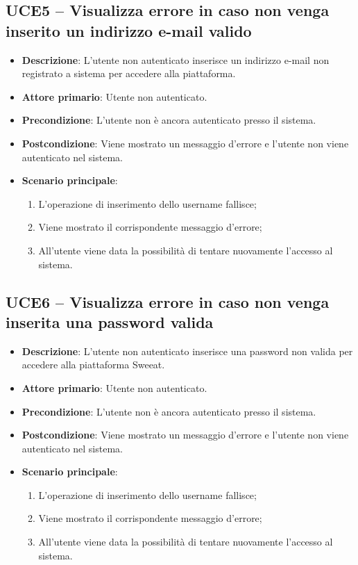\subsection{UCE5 – Visualizza errore in caso non venga inserito un indirizzo e-mail valido}
\begin{itemize}
\item \textbf{Descrizione}: L'utente non autenticato inserisce un indirizzo e-mail non registrato a sistema per accedere alla piattaforma.
\item \textbf{Attore primario}: Utente non autenticato.
\item \textbf{Precondizione}: L'utente non è ancora autenticato presso il sistema.
\item \textbf{Postcondizione}: Viene mostrato un messaggio d'errore e l'utente non viene autenticato nel sistema.

\item \textbf{Scenario principale}:
\begin{enumerate}
\item L'operazione di inserimento dello username fallisce;
\item Viene mostrato il corrispondente messaggio d'errore;
\item All'utente viene data la possibilità di tentare nuovamente l'accesso al sistema.
\end{enumerate}
\end{itemize}

\subsection{UCE6 – Visualizza errore in caso non venga inserita una password valida}
\begin{itemize}
\item \textbf{Descrizione}: L'utente non autenticato inserisce una password non valida per accedere alla piattaforma Sweeat.
\item \textbf{Attore primario}: Utente non autenticato.
\item \textbf{Precondizione}: L'utente non è ancora autenticato presso il sistema.
\item \textbf{Postcondizione}: Viene mostrato un messaggio d'errore e l'utente non viene autenticato nel sistema.

\item \textbf{Scenario principale}:
\begin{enumerate}
\item L'operazione di inserimento dello username fallisce;
\item Viene mostrato il corrispondente messaggio d'errore;
\item All'utente viene data la possibilità di tentare nuovamente l'accesso al sistema.
\end{enumerate}
\end{itemize}

